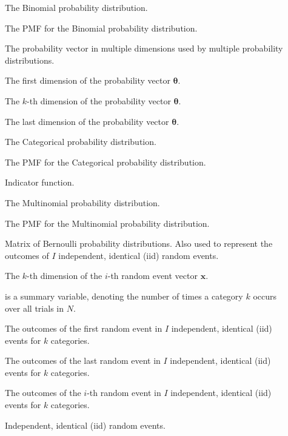 \begin{description}
	\item [\parbox{2cm}{$Bin$}] The Binomial probability distribution.
	\item [\parbox{2cm}{$f_{Bin}$}] The \acs{PMF} for the Binomial probability distribution.
	\item [\parbox{2cm}{$\boldsymbol{\theta}$}] The probability vector in multiple dimensions used by multiple probability distributions.
	\item [\parbox{2cm}{$\theta_{1}$}] The first dimension of the probability vector $\boldsymbol{\theta}$.
	\item [\parbox{2cm}{$\theta_{k}$}] The $k$-th dimension of the probability vector $\boldsymbol{\theta}$.
	\item [\parbox{2cm}{$\theta_{K}$}] The last dimension of the probability vector $\boldsymbol{\theta}$.
	\item [\parbox{2cm}{$Cat$}] The Categorical probability distribution.
	\item [\parbox{2cm}{$f_{Cat}$}] The \acs{PMF} for the Categorical probability distribution.
	\item [\parbox{2cm}{$\mathbbm{1}$}] Indicator function.
	\item [\parbox{2cm}{$Mul$}] The Multinomial probability distribution.
	\item [\parbox{2cm}{$f_{Mul}$}] The \acs{PMF} for the Multinomial probability distribution.
	\item [\parbox{2cm}{$\boldsymbol{X}$}] Matrix of Bernoulli probability distributions. Also used to represent the outcomes of $I$ independent, identical (iid) random events.
	\item [\parbox{2cm}{$x_{i,k}$}] The $k$-th dimension of the $i$-th random event vector $\boldsymbol{x}$.
	\item [\parbox{2cm}{$N_{k}$}] is a summary variable, denoting the number of times a category $k$ occurs over all trials in $N$.
	\item [\parbox{2cm}{$\boldsymbol{x_{1}}$}] The outcomes of the first random event in $I$ independent, identical (iid) events for $k$ categories.
	\item [\parbox{2cm}{$\boldsymbol{x_{I}}$}] The outcomes of the last random event in $I$ independent, identical (iid) events for $k$ categories.
	\item [\parbox{2cm}{$\boldsymbol{x_{i}}$}] The outcomes of the $i$-th random event in $I$ independent, identical (iid) events for $k$ categories.
	\item [\parbox{2cm}{$\overset{\text{iid}}{\sim}$}] Independent, identical (iid) random events.

\end{description}
